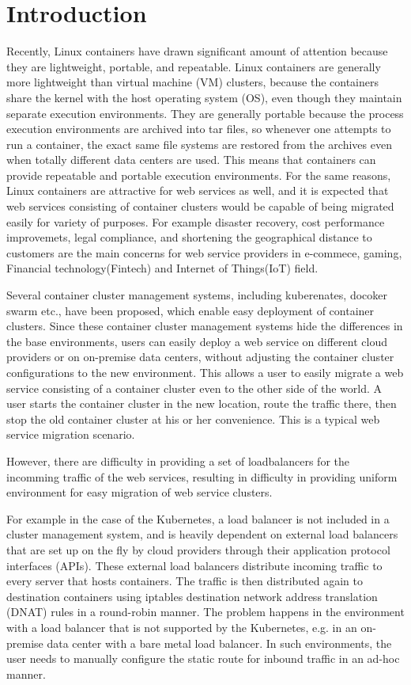 \section{Introduction}

Recently, Linux containers have drawn significant amount of attention because they are lightweight, portable, and repeatable.
Linux containers are generally more lightweight than virtual machine (VM) clusters, 
because the containers share the kernel with the host operating system (OS), even though they maintain separate execution environments. 
They are generally portable because the process execution environments are archived into tar files, 
so whenever one attempts to run a container, the exact same file systems are restored from the archives 
even when totally different data centers are used. 
This means that containers can provide repeatable and portable execution environments.
%
For the same reasons, Linux containers are attractive for web services as well, 
and it is expected that web services consisting of container clusters would be 
capable of being migrated easily for variety of purposes. For example disaster recovery, 
cost performance improvemets, legal compliance, and shortening the geographical distance to customers 
are the main concerns for web service providers in e-commece, gaming, Financial technology(Fintech) and Internet of Things(IoT) field.
%

Several container cluster management systems, including kuberenates, docoker swarm etc.,  have been proposed, which  
enable easy deployment of container clusters.
Since these container cluster management systems hide the differences in the base environments, users can easily deploy a web service on different cloud providers or on on-premise data centers, without adjusting the container cluster configurations to the new environment. 
This allows a user to easily migrate a web service consisting of a container cluster even to the other side of the world. 
A user starts the container cluster in the new location, route the traffic there, 
then stop the old container cluster at his or her convenience.
This is a typical web service migration scenario.

However, there are difficulty in providing a set of loadbalancers for the incomming traffic of the web services, resulting in difficulty in providing uniform environment for easy migration of web service clusters.  

For example in the case of the Kubernetes, a load balancer is not included in a cluster management system, and is heavily dependent on external load balancers that are set up on the fly 
by cloud providers through their application protocol interfaces (APIs). 
These external load balancers distribute incoming traffic to every server that hosts containers.
The traffic is then distributed again to destination containers using iptables destination 
network address translation (DNAT)\cite{MartinA.Brown2017,Marmol2015} rules in a round-robin manner. 
The problem happens in the environment with a load balancer that is not supported by the Kubernetes, 
e.g. in an on-premise data center with a bare metal load balancer. 
In such environments, the user needs to manually configure 
the static route for inbound traffic in an ad-hoc manner. 


